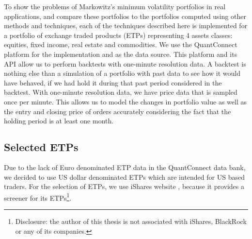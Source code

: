     
To show the problems of Markowitz's minimum volatility portfolios in real applications, and compare these portfolios to the portfolios computed using other methods and techniques, each of the techniques described here is implemented for a portfolio of exchange traded products (ETPs) representing 4 assets classes: equities, fixed income, real estate and commodities. We use the QuantConnect platform \cite{qcwebsite} for the implementation and as the data source. This platform and its API allow us to perform backtests with one-minute resolution data. A backtest is nothing else than a simulation of a portfolio with past data to see how it would have behaved, if we had hold it during that past period considered in the backtest. With one-minute resolution data, we have price data that is sampled once per minute. This allows us to model the changes in portfolio value as well as the entry and closing price of orders accurately considering the fact that the holding period is at least one month.

\subsection{Selected ETPs}
    Due to the lack of Euro denominated ETP data in the QuantConnect data bank, we decided to use US dollar denominated ETPs which are intended for US based traders. For the selection of ETPs, we use iShares website \cite{isharesscreener}, because it provides a screener for its ETPs\footnote{Disclosure: the author of this thesis is not associated with iShares, BlackRock or any of its companies.}.
    
